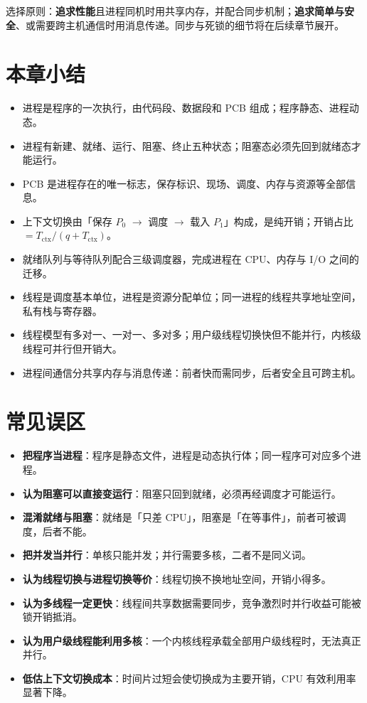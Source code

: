 \noindent 选择原则：\textbf{追求性能}且进程同机时用共享内存，并配合同步机制；\textbf{追求简单与安全}、或需要跨主机通信时用消息传递。同步与死锁的细节将在后续章节展开。

\section{本章小结}

\begin{itemize}
    \item 进程是程序的一次执行，由代码段、数据段和 PCB 组成；程序静态、进程动态。
    \item 进程有新建、就绪、运行、阻塞、终止五种状态；阻塞态必须先回到就绪态才能运行。
    \item PCB 是进程存在的唯一标志，保存标识、现场、调度、内存与资源等全部信息。
    \item 上下文切换由「保存 $P_0$ $\to$ 调度 $\to$ 载入 $P_1$」构成，是纯开销；开销占比 $= T_{\text{ctx}}/(q+T_{\text{ctx}})$。
    \item 就绪队列与等待队列配合三级调度器，完成进程在 CPU、内存与 I/O 之间的迁移。
    \item 线程是调度基本单位，进程是资源分配单位；同一进程的线程共享地址空间，私有栈与寄存器。
    \item 线程模型有多对一、一对一、多对多；用户级线程切换快但不能并行，内核级线程可并行但开销大。
    \item 进程间通信分共享内存与消息传递：前者快而需同步，后者安全且可跨主机。
\end{itemize}

\section{常见误区}

\begin{itemize}
    \item \textbf{把程序当进程}：程序是静态文件，进程是动态执行体；同一程序可对应多个进程。
    \item \textbf{认为阻塞可以直接变运行}：阻塞只回到就绪，必须再经调度才可能运行。
    \item \textbf{混淆就绪与阻塞}：就绪是「只差 CPU」，阻塞是「在等事件」，前者可被调度，后者不能。
    \item \textbf{把并发当并行}：单核只能并发；并行需要多核，二者不是同义词。
    \item \textbf{认为线程切换与进程切换等价}：线程切换不换地址空间，开销小得多。
    \item \textbf{认为多线程一定更快}：线程间共享数据需要同步，竞争激烈时并行收益可能被锁开销抵消。
    \item \textbf{认为用户级线程能利用多核}：一个内核线程承载全部用户级线程时，无法真正并行。
    \item \textbf{低估上下文切换成本}：时间片过短会使切换成为主要开销，CPU 有效利用率显著下降。
\end{itemize}
